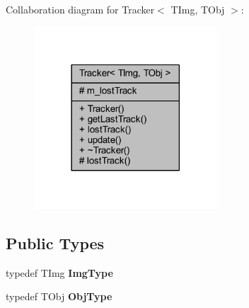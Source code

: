 Collaboration diagram for Tracker$<$ T\+Img, T\+Obj $>$\+:
\nopagebreak
\begin{figure}[H]
\begin{center}
\leavevmode
\includegraphics[width=194pt]{class_vision_core_1_1_interfaces_1_1_tracker__coll__graph}
\end{center}
\end{figure}
\subsection*{Public Types}
\begin{DoxyCompactItemize}
\item 
\hypertarget{class_vision_core_1_1_interfaces_1_1_tracker_aaafe8051ac78bd4d8ed3027acd24a1c0}{}typedef T\+Img {\bfseries Img\+Type}\label{class_vision_core_1_1_interfaces_1_1_tracker_aaafe8051ac78bd4d8ed3027acd24a1c0}

\item 
\hypertarget{class_vision_core_1_1_interfaces_1_1_tracker_a34f8ad85716743523e520af46032716e}{}typedef T\+Obj {\bfseries Obj\+Type}\label{class_vision_core_1_1_interfaces_1_1_tracker_a34f8ad85716743523e520af46032716e}

\end{DoxyCompactItemize}
